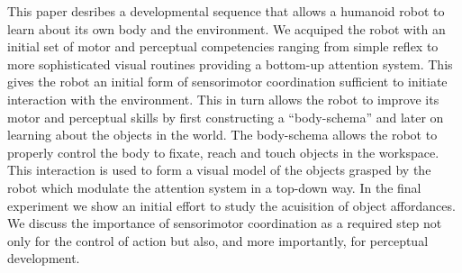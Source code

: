 This paper desribes a developmental sequence that allows a humanoid robot to learn about its own body and the environment. We acquiped the robot with an initial set of motor and perceptual competencies ranging from simple reflex to more sophisticated visual routines providing a bottom-up attention system. This gives the robot an initial form of sensorimotor coordination sufficient to initiate interaction with the environment. This in turn allows the robot to improve its motor and perceptual skills by first constructing a ``body-schema'' and later on learning about the objects in the world. The body-schema allows the robot to properly control the body to fixate, reach and touch objects in the workspace. This interaction is used to form a visual model of the objects grasped by the robot which modulate the attention system in a top-down way. In the final experiment we show an initial effort to study the acuisition of object affordances. We discuss the importance of sensorimotor coordination as a required step not only for the control of action but also, and more importantly, for perceptual development.

